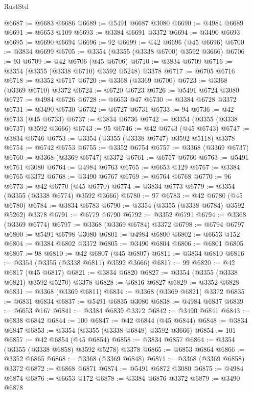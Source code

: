 \begin{lexlean}{RustStd}
\begin{coremodule}
@6687 := @6683 @6686
@6689 := @5491 @6687 @3080
@6690 := @4984 @6689
@6691 := @6653 @109
@6693 := @3384 @6691 @3372
@6694 := @3490 @6693
@6695 := @6690 @6694
@6696 := 92
@6699 := @42 @6696 (@45 @6696)
@6700 := @3834 @6699
@6705 := @3354 (@3355 (@3338 @6700) @3592 @3666)
@6706 := 93
@6709 := @42 @6706 (@45 @6706)
@6710 := @3834 @6709
@6716 := @3354 (@3355 (@3338 @6710) @3592 @5248) @3378
@6717 := @6705 @6716
@6718 := @3352 @6717
@6720 := @3368 (@3369 @6700)
@6723 := @3368 (@3369 @6710) @3372
@6724 := @6720 @6723
@6726 := @5491 @6724 @3080
@6727 := @4984 @6726
@6728 := @6653 @47
@6730 := @3384 @6728 @3372
@6731 := @3490 @6730
@6732 := @6727 @6731
@6733 := 94
@6736 := @42 @6733 (@45 @6733)
@6737 := @3834 @6736
@6742 := @3354 (@3355 (@3338 @6737) @3592 @3666)
@6743 := 95
@6746 := @42 @6743 (@45 @6743)
@6747 := @3834 @6746
@6753 := @3354 (@3355 (@3338 @6747) @3592 @5118) @3378
@6754 := @6742 @6753
@6755 := @3352 @6754
@6757 := @3368 (@3369 @6737)
@6760 := @3368 (@3369 @6747) @3372
@6761 := @6757 @6760
@6763 := @5491 @6761 @3080
@6764 := @4984 @6763
@6765 := @6653 @129
@6767 := @3384 @6765 @3372
@6768 := @3490 @6767
@6769 := @6764 @6768
@6770 := 96
@6773 := @42 @6770 (@45 @6770)
@6774 := @3834 @6773
@6779 := @3354 (@3355 (@3338 @6774) @3592 @3666)
@6780 := 97
@6783 := @42 @6780 (@45 @6780)
@6784 := @3834 @6783
@6790 := @3354 (@3355 (@3338 @6784) @3592 @5262) @3378
@6791 := @6779 @6790
@6792 := @3352 @6791
@6794 := @3368 (@3369 @6774)
@6797 := @3368 (@3369 @6784) @3372
@6798 := @6794 @6797
@6800 := @5491 @6798 @3080
@6801 := @4984 @6800
@6802 := @6653 @152
@6804 := @3384 @6802 @3372
@6805 := @3490 @6804
@6806 := @6801 @6805
@6807 := 98
@6810 := @42 @6807 (@45 @6807)
@6811 := @3834 @6810
@6816 := @3354 (@3355 (@3338 @6811) @3592 @3666)
@6817 := 99
@6820 := @42 @6817 (@45 @6817)
@6821 := @3834 @6820
@6827 := @3354 (@3355 (@3338 @6821) @3592 @5270) @3378
@6828 := @6816 @6827
@6829 := @3352 @6828
@6831 := @3368 (@3369 @6811)
@6834 := @3368 (@3369 @6821) @3372
@6835 := @6831 @6834
@6837 := @5491 @6835 @3080
@6838 := @4984 @6837
@6839 := @6653 @167
@6841 := @3384 @6839 @3372
@6842 := @3490 @6841
@6843 := @6838 @6842
@6844 := 100
@6847 := @42 @6844 (@45 @6844)
@6848 := @3834 @6847
@6853 := @3354 (@3355 (@3338 @6848) @3592 @3666)
@6854 := 101
@6857 := @42 @6854 (@45 @6854)
@6858 := @3834 @6857
@6864 := @3354 (@3355 (@3338 @6858) @3592 @5278) @3378
@6865 := @6853 @6864
@6866 := @3352 @6865
@6868 := @3368 (@3369 @6848)
@6871 := @3368 (@3369 @6858) @3372
@6872 := @6868 @6871
@6874 := @5491 @6872 @3080
@6875 := @4984 @6874
@6876 := @6653 @172
@6878 := @3384 @6876 @3372
@6879 := @3490 @6878

\end{coremodule}
\end{lexlean}
